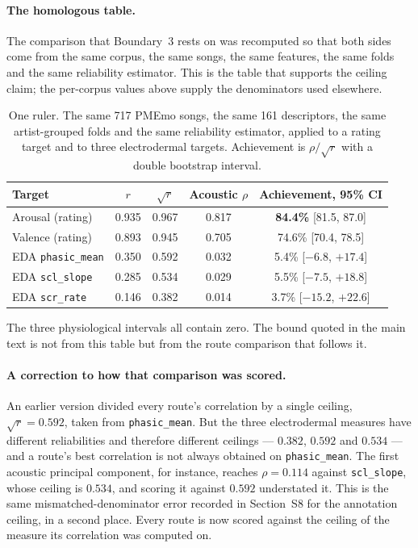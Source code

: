 \paragraph{The homologous table.}
The comparison that Boundary~3 rests on was recomputed so that both sides come from
the same corpus, the same songs, the same features, the same folds and the same
reliability estimator. This is the table that supports the ceiling claim; the
per-corpus values above supply the denominators used elsewhere.

\begin{table}[htbp]
\centering\small
\caption{One ruler. The same 717 PMEmo songs, the same 161 descriptors, the same
artist-grouped folds and the same reliability estimator, applied to a rating target
and to three electrodermal targets. Achievement is $\rho/\sqrt{r}$ with a double
bootstrap interval.}
\begin{tabular}{lcccc}
\toprule
Target & $r$ & $\sqrt{r}$ & Acoustic $\rho$ & Achievement, 95\% CI \\
\midrule
Arousal (rating)  & 0.935 & 0.967 & 0.817 & \textbf{84.4\%} [81.5, 87.0] \\
Valence (rating)  & 0.893 & 0.945 & 0.705 & 74.6\% [70.4, 78.5] \\
EDA \texttt{phasic\_mean} & 0.350 & 0.592 & 0.032 & 5.4\% [$-6.8$, $+17.4$] \\
EDA \texttt{scl\_slope}   & 0.285 & 0.534 & 0.029 & 5.5\% [$-7.5$, $+18.8$] \\
EDA \texttt{scr\_rate}    & 0.146 & 0.382 & 0.014 & 3.7\% [$-15.2$, $+22.6$] \\
\bottomrule
\end{tabular}
\end{table}

The three physiological intervals all contain zero. The bound quoted in the main text
is not from this table but from the route comparison that follows it.

\paragraph{A correction to how that comparison was scored.} An earlier version
divided every route's correlation by a single ceiling, $\sqrt{r} = 0.592$, taken from
\texttt{phasic\_mean}. But the three electrodermal measures have different
reliabilities and therefore different ceilings --- $0.382$, $0.592$ and $0.534$ --- and
a route's best correlation is not always obtained on \texttt{phasic\_mean}. The first
acoustic principal component, for instance, reaches $\rho = 0.114$ against
\texttt{scl\_slope}, whose ceiling is $0.534$, and scoring it against $0.592$
understated it. This is the same mismatched-denominator error recorded in
Section~S8 for the annotation ceiling, in a second place. Every route is now scored
against the ceiling of the measure its correlation was computed on.

